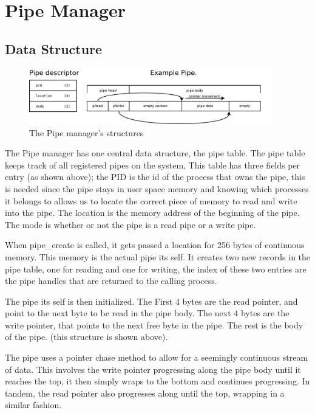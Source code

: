 \documentclass[a4paper]{report}
\begin{document}
\clearpage






\section{Pipe Manager}

\subsection{Data Structure}

\begin{figure}[ht]
\centering
\includegraphics[width=400px]{images/Pipe_Manager}
\caption{The Pipe manager's structures}
\label{fig:WinTitleBarScreen}
\end{figure}



The Pipe manager has one central data structure, the pipe table. The pipe table keeps track of all registered pipes on the system, This table has three fields per entry (as shown above); the PID is the id of the process that owns the pipe, this is needed since the pipe stays in user space memory and knowing which processes it belongs to allows us to locate the correct piece of memory to read and write into the pipe. The location is the memory address of the beginning of the pipe. The mode is whether or not the pipe is a read pipe or a write pipe.

When pipe\_create is called, it gets passed a location for 256 bytes of continuous memory. This memory is the actual pipe its self. It creates two new records in the pipe table, one for reading and one for writing, the index of these two entries are the pipe handles that are returned to the calling process. 

The pipe its self is then initialized. The First 4 bytes are the read pointer, and point to the next byte to be read in the pipe body. The next 4 bytes are the write pointer, that points to the next free byte in the pipe. The rest is the body of the pipe. (this structure is shown above). 

The pipe uses a pointer chase method to allow for a seemingly continuous stream of data. This involves the write pointer progressing along the pipe body until it reaches the top, it then simply wraps to the bottom and continues progressing. In tandem, the read pointer also progresses along until the top, wrapping in a similar fashion.
\end{document}
